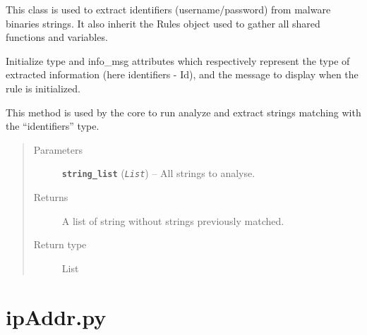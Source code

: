 \documentclass[letterpaper,10pt,oneside]{sphinxmanual}
\begin{document}
\begin{fulllineitems}
\label{index:lib.allRules.id.Id}
This class is used to extract identifiers (username/password) from
malware binaries strings. It also inherit the Rules object used to
gather all shared functions and variables.

\begin{fulllineitems}
\label{index:lib.allRules.id.Id.__init__}
Initialize type and info\_msg attributes which respectively represent
the type of extracted information (here identifiers - Id),
and the message to display when the rule is initialized.

\end{fulllineitems}


\begin{fulllineitems}
\label{index:lib.allRules.id.Id.run_analysis}
This method is used by the core to run analyze and extract strings
matching with the ``identifiers'' type.
\begin{quote}\begin{description}
\item[{Parameters}] \leavevmode
\textbf{\texttt{string\_list}} (\emph{\texttt{List}}) -- All strings to analyse.

\item[{Returns}] \leavevmode
A list of string without strings previously matched.

\item[{Return type}] \leavevmode
List

\end{description}\end{quote}

\end{fulllineitems}


\end{fulllineitems}



\section{ipAddr.py}
\label{index:ipaddr-py}\label{index:module-lib.allRules.ipAddr}
\end{document}
